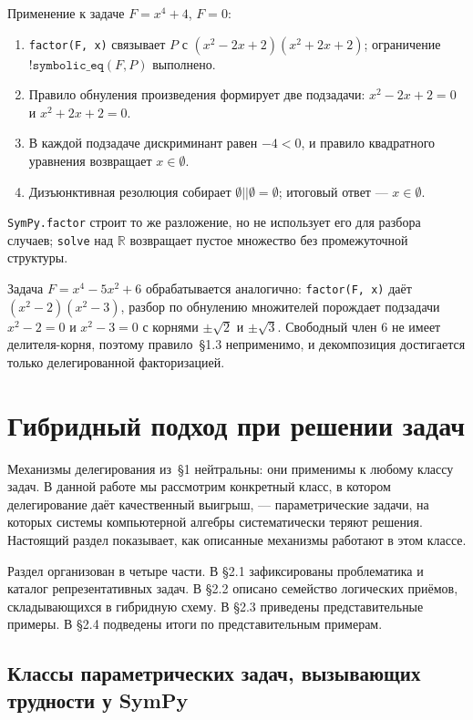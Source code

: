 \documentclass{intsys}
\begin{document}
Применение к задаче $F = x^4 + 4$, $F = 0$:

\begin{enumerate}
  \item \texttt{factor(F, x)} связывает $P$ с
    $(x^2 - 2x + 2)(x^2 + 2x + 2)$; ограничение
    $\texttt{!symbolic\_eq}(F, P)$ выполнено.
  \item Правило обнуления произведения формирует две подзадачи:
    $x^2 - 2x + 2 = 0$ и $x^2 + 2x + 2 = 0$.
  \item В каждой подзадаче дискриминант равен $-4 < 0$, и правило
    квадратного уравнения возвращает $x \in \emptyset$.
  \item Дизъюнктивная резолюция собирает
    $\emptyset \mathrel{||} \emptyset = \emptyset$; итоговый ответ ---
    $x \in \emptyset$.
\end{enumerate}

\texttt{SymPy.factor} строит то же разложение, но не использует его
для разбора случаев; \texttt{solve} над $\mathbb{R}$ возвращает пустое
множество без промежуточной структуры.

Задача $F = x^4 - 5x^2 + 6$ обрабатывается аналогично:
\texttt{factor(F, x)} даёт $(x^2 - 2)(x^2 - 3)$, разбор по обнулению
множителей порождает подзадачи $x^2 - 2 = 0$ и $x^2 - 3 = 0$ с
корнями $\pm\sqrt 2$ и $\pm\sqrt 3$. Свободный член $6$ не имеет
делителя-корня, поэтому правило~\S1.3 неприменимо, и декомпозиция
достигается только делегированной факторизацией.

\section{Гибридный подход при решении задач}

Механизмы делегирования из~\S1 нейтральны: они применимы к любому
классу задач. В данной работе мы рассмотрим конкретный класс, в
котором делегирование даёт качественный выигрыш, ---
параметрические задачи, на которых системы компьютерной алгебры
систематически теряют решения. Настоящий раздел показывает, как
описанные механизмы работают в этом классе.

Раздел организован в четыре части. В \S2.1 зафиксированы
проблематика и каталог репрезентативных задач. В \S2.2 описано
семейство логических приёмов, складывающихся в гибридную схему. В
\S2.3 приведены представительные примеры. В \S2.4 подведены итоги
по представительным примерам.

\subsection{Классы параметрических задач, вызывающих трудности у SymPy}
\end{document}
